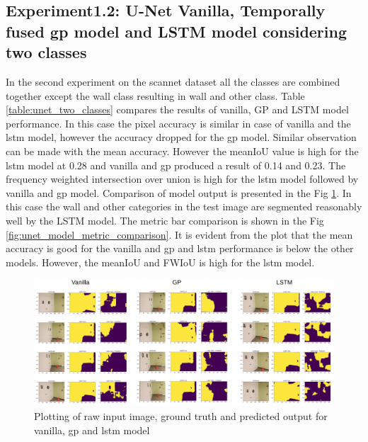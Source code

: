     \subsection{Experiment1.2: U-Net Vanilla, Temporally fused gp model and LSTM model considering two classes}
	In the second experiment on the scannet dataset all the classes are combined together except the wall class resulting in wall and other class. Table \ref{table:unet_two_classes} compares the results of vanilla, GP and LSTM model performance. In this case the pixel accuracy is similar in case of vanilla and the lstm model, however the accuracy dropped for the gp model. Similar observation can be made with the mean accuracy. However the meanIoU value is high for the lstm model at 0.28 and vanilla and gp produced a result of 0.14 and 0.23. The frequency weighted intersection over union is high for the lstm model followed by vanilla and gp model. Comparison of model output is presented in the Fig \ref{fig:output_vanilla}. In this case the wall and other categories in the test image are segmented reasonably well by the LSTM model. The metric bar comparison is shown in the Fig \ref{fig:unet_model_metric_comparison}. It is evident from the plot that the mean accuracy is good for the vanilla and gp and lstm performance is below the other models. However, the meanIoU and FWIoU is high for the lstm model.
	
	\begin{figure}[h]
		\centering
		\includegraphics[width=16cm]{images/output_unet_two_classes.png}
		\caption{Plotting of raw input image, ground truth and predicted output for vanilla, gp and lstm model}
		\label{fig:output_vanilla}
	\end{figure}
	
